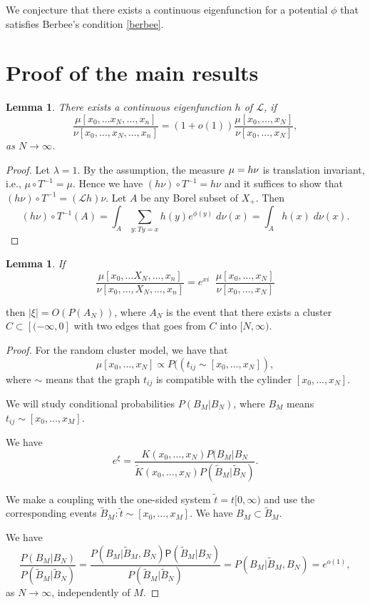 \documentclass[11pt, a4paper, oneside]{article}
\newtheorem{lem}[thm]{Lemma}
\theoremstyle{definition}
\theoremstyle{remark}
\renewcommand{\P}{\mathsf{P}}
\providecommand{\tl}{\tilde}
\begin{document}
We conjecture that there exists a continuous eigenfunction for a potential
$\phi$ that satisfies Berbee's condition \eqref{berbee}.

\section{Proof of the main results}\noindent
\begin{lem}
  There exists a continuous eigenfunction $h$ of ${\mathcal L}$, if
$$\frac{\mu[x_0,\ldots x_N, \ldots, x_n]}{\nu[x_0,\ldots, x_N, \ldots, x_n]}=(1+o(1)) \frac{\mu[x_0,\ldots, x_N]}{\nu[x_0, \ldots, x_N]},$$
as $N\to \infty$.
\end{lem}
\begin{proof}
  Let $\lambda=1$. By the assumption, the measure $\mu= h \nu$ is translation
  invariant, i.e., $\mu\circ T^{-1}=\mu$. Hence we have $(h\nu)\circ
  T^{-1}=h\nu$ and it suffices to show that $(h\nu)\circ T^{-1}=({\mathcal
    L}h)\nu$. Let $A$ be any Borel subset of $X_+$. Then
$$(h\nu)\circ T^{-1} (A)=\int_A \sum_{y: Ty=x} h(y)e^{\phi(y)}\; d\nu(x)=\int_A h(x)\; d\nu(x).$$
\end{proof}

\begin{lem}
  If $$\frac{\mu[x_0,\ldots X_N, \ldots, x_n]}{\nu[x_0,\ldots, X_N, \ldots,
    x_n]}=e^{xi}\; \; \frac{\mu[x_0,\ldots, x_N]}{\nu[x_0, \ldots, x_N]}$$
\end{lem}
then $|\xi|=O(P(A_N))$, where $A_N$ is the event that there exists a cluster
$C\subset [(-\infty, 0]$ with two edges that goes from $C$ into $[N,\infty)$.
\begin{proof}
  For the random cluster model, we have that
$$\mu[x_0,\ldots, x_N]\propto P((t_{ij} \sim [x_0, \ldots, x_N]),$$
where $\sim$ means that the graph $t_{ij}$ is compatible with the cylinder
$[x_0,\ldots, x_N]$.

We will study conditional probabilities $P(B_M|B_N)$, where $B_M$ means
$t_{ij}\sim [x_0,\ldots, x_M]$.

We have
$$e^{\xi}=\frac{K(x_0,\ldots, x_N)P(B_M|B_N}{\tl K(x_0,\ldots, x_N)P(\tilde B_M|\tilde B_N)}.$$

We make a coupling with the one-sided system $\tilde t=t[0,\infty)$ and use the
corresponding events $\tilde B_M: \tilde t \sim [x_0,\ldots, x_M]$. We have
$B_M\subset \tilde B_M$.

We have
$$ 
\frac{P(B_M|B_N)}{P(\tilde B_M| \tilde B_N)}= \frac{P(B_M|\tilde B_M, B_N)
  \P(\tilde B_M|B_N)} {P(\tilde B_M|\tilde B_N)}=P(B_M|\tilde B_M,
B_N)=e^{o(1)},
$$
as $N\to \infty$, independently of $M$.
\end{proof}
\end{document}
